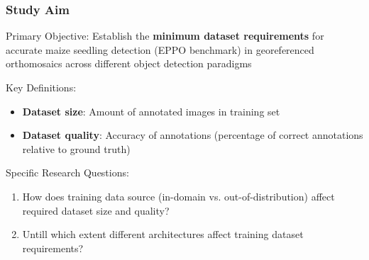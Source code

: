 \documentclass[aspectratio=43]{beamer}
\begin{document}
\begin{frame}
    \frametitle{\small Study Aim}
    
    \begin{exampleblock}{Primary Objective:}
        Establish the \textbf{minimum dataset requirements} for accurate maize seedling detection (EPPO benchmark) in georeferenced orthomosaics across different object detection paradigms
    \end{exampleblock}
    
    \begin{block}{Key Definitions:}
        \small
        \begin{itemize}
            \item \textbf{Dataset size}: Amount of annotated images in training set
            \item \textbf{Dataset quality}: Accuracy of annotations (percentage of correct annotations relative to ground truth)
        \end{itemize}
    \end{block}
    
    \begin{block}{Specific Research Questions:}
        \small
        \begin{enumerate}
            \item How does training data source (in-domain vs. out-of-distribution) affect required dataset size and quality?
            \item Untill which extent different architectures affect training dataset requirements?
        \end{enumerate}
    \end{block}
\end{frame}
\end{document}
